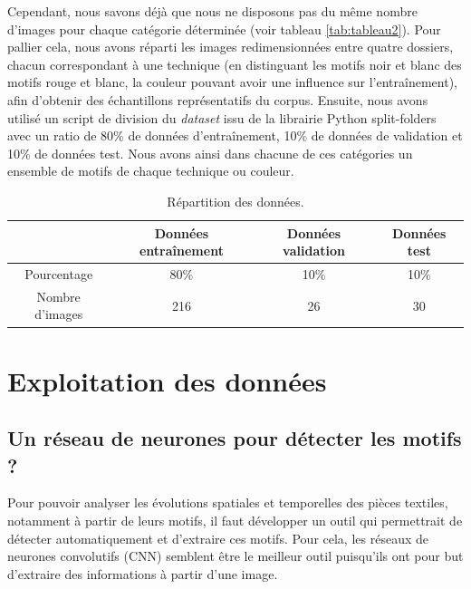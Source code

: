 \documentclass[a4paper, twoside, 12pt]{book}
\begin{document}
Cependant, nous savons déjà que nous ne disposons pas du même nombre d'images pour chaque catégorie déterminée (voir tableau \ref{tab:tableau2}). Pour pallier cela, nous avons réparti les images redimensionnées entre quatre dossiers, chacun correspondant à une technique (en distinguant les motifs noir et blanc des motifs rouge et blanc, la couleur pouvant avoir une influence sur l'entraînement), afin d'obtenir des échantillons représentatifs du corpus. Ensuite, nous avons utilisé un script de division du \textit{dataset} issu de la librairie Python split-folders avec un ratio de 80\% de données d'entraînement, 10\% de données de validation et 10\% de données test. Nous avons ainsi dans chacune de ces catégories un ensemble de motifs de chaque technique ou couleur. 

\begin{table}[!h]
    \centering
    \begin{tabular}{|c|c|c|c|}
        \hline
        & \cellcolor{blue!20}\textbf{Données entraînement}& \cellcolor{blue!20} \textbf{Données validation} & \cellcolor{blue!20} \textbf{Données test} \\ \hline \hline
         Pourcentage & 80\% & 10\% & 10\% \\ \hline
         Nombre d'images & 216 & 26 & 30 \\ \hline
        
    \end{tabular}
    \caption{Répartition des données.}
    \label{tab:trainTest}
\end{table}



\chapter{Exploitation des données}
\section{Un réseau de neurones pour détecter les motifs ? }

Pour pouvoir analyser les évolutions spatiales et temporelles des pièces textiles, notamment à partir de leurs motifs, il faut développer un outil qui permettrait de détecter automatiquement et d'extraire ces motifs. Pour cela, les réseaux de neurones convolutifs (CNN) semblent être le meilleur outil puisqu'ils ont pour but d'extraire des informations à partir d'une image. 
\end{document}

